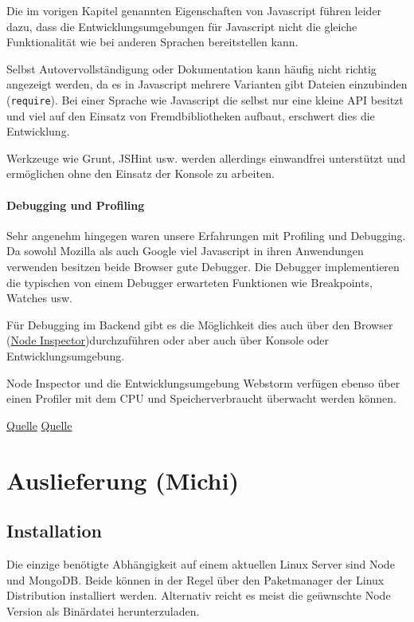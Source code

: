 Die im vorigen Kapitel genannten Eigenschaften von Javascript führen
leider dazu, dass die Entwicklungsumgebungen für Javascript nicht die
gleiche Funktionalität wie bei anderen Sprachen bereitstellen kann.

Selbst Autovervollständigung oder Dokumentation kann häufig nicht
richtig angezeigt werden, da es in Javascript mehrere Varianten gibt
Dateien einzubinden (\texttt{require}). Bei einer Sprache wie Javascript
die selbst nur eine kleine API besitzt und viel auf den Einsatz von
Fremdbibliotheken aufbaut, erschwert dies die Entwicklung.

Werkzeuge wie Grunt, JSHint usw. werden allerdings einwandfrei
unterstützt und ermöglichen ohne den Einsatz der Konsole zu arbeiten.

\subsubsection{Debugging und Profiling}\label{debugging-und-profiling}

Sehr angenehm hingegen waren unsere Erfahrungen mit Profiling und
Debugging. Da sowohl Mozilla als auch Google viel Javascript in ihren
Anwendungen verwenden besitzen beide Browser gute Debugger. Die Debugger
implementieren die typischen von einem Debugger erwarteten Funktionen
wie Breakpoints, Watches usw.

Für Debugging im Backend gibt es die Möglichkeit dies auch über den
Browser (\href{https://github.com/node-inspector/node-inspector}{Node
Inspector})durchzuführen oder aber auch über Konsole oder
Entwicklungsumgebung.

Node Inspector und die Entwicklungsumgebung Webstorm verfügen ebenso
über einen Profiler mit dem CPU und Speicherverbraucht überwacht werden
können.

\href{https://developer.chrome.com/devtools/docs/javascript-memory-profiling}{Quelle}
\href{https://developer.chrome.com/devtools/docs/cpu-profiling}{Quelle}

\chapter{Auslieferung (Michi)}\label{auslieferung-michi}

\section{Installation}\label{installation}

Die einzige benötigte Abhängigkeit auf einem aktuellen Linux Server sind
Node und MongoDB. Beide können in der Regel über den Paketmanager der
Linux Distribution installiert werden. Alternativ reicht es meist die
geüwnschte Node Version als Binärdatei herunterzuladen.

